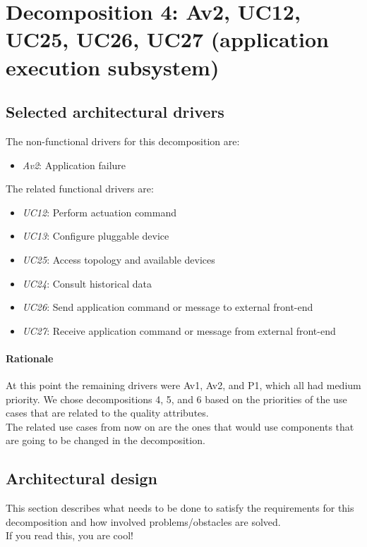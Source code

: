 \section{Decomposition 4: Av2, UC12, UC25, UC26, UC27 (application execution subsystem)}


\subsection*{Selected architectural drivers}
    The non-functional drivers for this decomposition are:
    \begin{itemize}
    	\item \emph{Av2}: Application failure
    \end{itemize}

    The related functional drivers are:
    \begin{itemize}
        \item \emph{UC12}: Perform actuation command
        \item \emph{UC13}: Configure pluggable device
        \item \emph{UC25}: Access topology and available devices
        \item \emph{UC24}: Consult historical data
        \item \emph{UC26}: Send application command or message to external front-end
        \item \emph{UC27}: Receive application command or message from external front-end
    \end{itemize}

    \paragraph{Rationale}
        At this point the remaining drivers were Av1, Av2, and P1,
        which all had medium priority. We chose decompositions 4, 5,
        and 6 based on the priorities of the use cases that are related to the quality attributes. \\
        The related use cases from now on are the ones that would use components
        that are going to be changed in the decomposition.


\subsection*{Architectural design}
    This section describes what needs to be done to satisfy the requirements for
    this decomposition and how involved problems/obstacles are solved. \\
    If you read this, you are cool!

